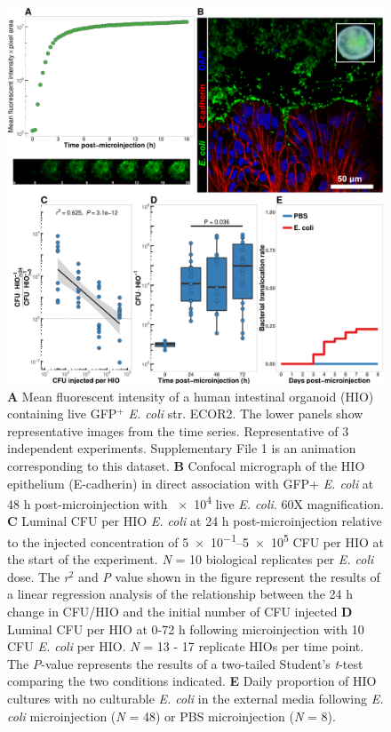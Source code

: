 \documentclass[9pt,lineo]{elife}
\begin{document}
\begin{figure}
\begin{fullwidth}
\includegraphics[width=0.95\linewidth]{./figures/figure1/figure1_multipanel.pdf}
\caption{\textbf{A} Mean fluorescent intensity of a human intestinal organoid (HIO) containing live GFP$^{+}$ \textit{E. coli} str. ECOR2.  The lower panels show representative images from the time series. Representative of 3 independent experiments. Supplementary File 1 is an animation corresponding to this dataset. \textbf{B} Confocal micrograph of the HIO epithelium (E-cadherin) in direct association with GFP+ \textit{E. coli} at 48 h post-microinjection with \num{e4} live \textit{E. coli}. 60X magnification. \textbf{C} Luminal CFU per HIO \textit{E. coli} at 24 h post-microinjection relative to the injected concentration of \numrange{5e-1}{5e5} CFU per HIO at the start of the experiment. \textit{N} = 10 biological replicates per \textit{E. coli} dose. The \textit{r}$^{2}$ and \textit{P} value shown in the figure represent the results of a linear regression analysis of the relationship between the 24 h change in CFU/HIO and the initial number of CFU injected \textbf{D} Luminal CFU per HIO at 0-72 h following microinjection with 10 CFU \textit{E. coli} per HIO. \textit{N} = 13 - 17 replicate HIOs per time point. The \textit{P}-value represents the results of a two-tailed Student's \textit{t}-test comparing the two conditions indicated. \textbf{E} Daily proportion of HIO cultures with no culturable \textit{E. coli} in the external media following \textit{E. coli} microinjection (\textit{N} = 48) or PBS microinjection (\textit{N} = 8).}
\label{fig:fullwidth}
\end{fullwidth}
\end{figure}
\end{document}
